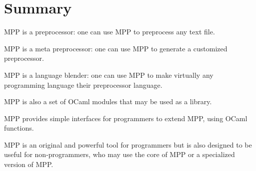 \documentclass[a4paper]{article}
\begin{document}
\section{Summary}
MPP is a preprocessor: one can use MPP to preprocess any text file.

MPP is a meta preprocessor: one can use MPP to generate a customized preprocessor.

MPP is a language blender: one can use MPP to make virtually any programming language 
their preprocessor language. 

MPP is also a set of OCaml modules that may be used as a library.

MPP provides simple interfaces for programmers to extend MPP, using OCaml functions.

MPP  is an  original and  powerful tool  for programmers but is also
designed to be useful for non-programmers, who may use the core of MPP
or a specialized version of MPP.
\end{document}
